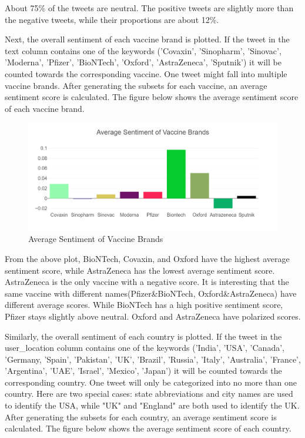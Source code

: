 \documentclass{article}
\begin{document}
About 75\% of the tweets are neutral. The positive tweets are slightly more than the negative tweets, while their proportions are about 12\%. 

Next, the overall sentiment of each vaccine brand is plotted. If the tweet in the text column contains one of the keywords ('Covaxin', 'Sinopharm', 'Sinovac', 'Moderna', 'Pfizer', 'BioNTech', 'Oxford', 'AstraZeneca', 'Sputnik') it will be counted towards the corresponding vaccine. One tweet might fall into multiple vaccine brands. After generating the subsets for each vaccine, an average sentiment score is calculated. The figure below shows the average sentiment score of each vaccine brand.

\begin{figure}[H]
\centering
\includegraphics[width=15cm]{EDA2.png}
\caption{Average Sentiment of Vaccine Brands}
\end{figure}

From the above plot, BioNTech, Covaxin, and Oxford have the highest average sentiment score, while AstraZeneca has the lowest average sentiment score. AstraZeneca is the only vaccine with a negative score. It is interesting that the same vaccine with different names(Pfizer\&BioNTech, Oxford\&AstraZeneca) have different average scores. While BioNTech has a high positive sentiment score, Pfizer stays slightly above neutral. Oxford and AstraZeneca have polarized scores.

Similarly, the overall sentiment of each country is plotted. If the tweet in the user\_location column contains one of the keywords ('India', 'USA', 'Canada', 'Germany, 'Spain', 'Pakistan', 'UK', 'Brazil', 'Russia', 'Italy', 'Australia', 'France', 'Argentina', 'UAE', 'Israel', 'Mexico', 'Japan') it will be counted towards the corresponding country. One tweet will only be categorized into no more than one country. Here are two special cases: state abbreviations and city names are used to identify the USA, while "UK" and "England" are both used to identify the UK. After generating the subsets for each country, an average sentiment score is calculated. The figure below shows the average sentiment score of each country.
\end{document}
